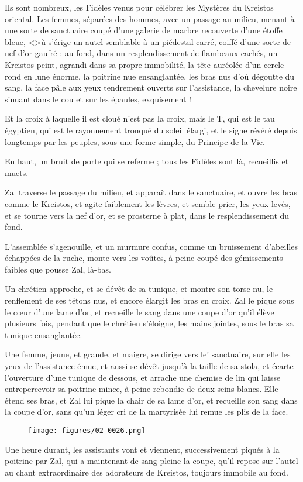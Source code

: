 \documentclass[a4paper, 11pt, oneside, polutonikogreek, french]{article}
\begin{document}
Ils sont nombreux, les Fidèles venus pour célébrer les Mystères du Kreistos oriental. Les femmes, séparées des hommes, avec un passage au milieu, menant à une sorte de sanctuaire coupé d'une galerie de marbre recouverte d'une étoffe bleue, <>ù s'érige un autel semblable à un piédestal carré, coiffé d'une sorte de nef d'or gaufré : au fond, dans un resplendissement de flambeaux cachés, un Kreistos peint, agrandi dans sa propre immobilité, la tête auréolée d'un cercle rond en lune énorme, la poitrine nue ensanglantée, les bras nus d'où dégoutte du sang, la face pâle aux yeux tendrement ouverts sur l'assistance, la chevelure noire sinuant dans le cou et sur les épaules, exquisement !

Et la croix à laquelle il est cloué n'est pas la croix, mais le T, qui est le tau égyptien, qui est le rayonnement tronqué du soleil élargi, et le signe révéré depuis longtemps par les peuples, sous une forme simple, du Principe de la Vie.

En haut, un bruit de porte qui se referme ; tous les Fidèles sont là, recueillis et muets.

Zal traverse le passage du milieu, et apparaît dans le sanctuaire, et ouvre les bras comme le Kreistos, et agite faiblement les lèvres, et semble prier, les yeux levés, et se tourne vers la nef d'or, et se prosterne à plat, dans le resplendissement du fond.

L'assemblée s'agenouille, et un murmure confus, comme un bruissement d'abeilles échappées de la ruche, monte vers les voûtes, à peine coupé des gémissements faibles que pousse Zal, là-bas.

Un chrétien approche, et se dévêt de sa tunique, et montre son torse nu, le renflement de ses tétons nus, et encore élargit les bras en croix. Zal le pique sous le cœur d'une lame d'or, et recueille le sang dans une coupe d'or qu'il élève plusieurs fois, pendant que le chrétien s'éloigne, les mains jointes, sous le bras sa tunique ensanglantée.

Une femme, jeune, et grande, et maigre, se dirige vers le' sanctuaire, sur elle les yeux de l'assistance émue, et aussi se dévêt jusqu'à la taille de sa stola, et écarte l'ouverture d'une tunique de dessous, et arrache une chemise de lin qui laisse entrepercevoir sa poitrine mince, à peine rebondie de deux seins blancs. Elle étend ses bras, et Zal lui pique la chair de sa lame d'or, et recueille son sang dans la coupe d'or, sans qu'un léger cri de la martyrisée lui remue les plis de la face.
\begin{figure}[H]
\centering
\texttt{[image: figures/02-0026.png]}
\end{figure}
Une heure durant, les assistants vont et viennent, successivement piqués à la poitrine par Zal, qui a maintenant de sang pleine la coupe, qu'il repose sur l'autel au chant extraordinaire des adorateurs de Kreistos, toujours immobile au fond.
\end{document}
